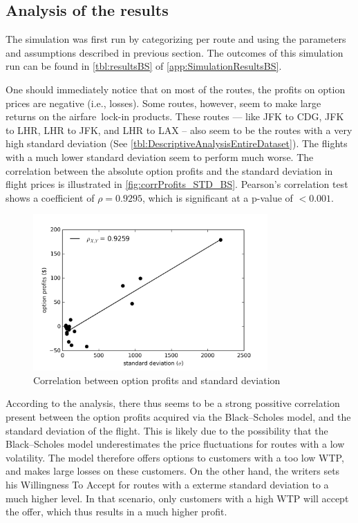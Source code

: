 \subsection{Analysis of the results}
\label{subsec:AnalysisOfBS}
The simulation was first run by categorizing per route and using the parameters and assumptions described in previous section. The outcomes of this simulation run can be found in \autoref{tbl:resultsBS} of \autoref{app:SimulationResultsBS}.

One should immediately notice that on most of the routes, the profits on option prices are negative (i.e., losses). Some routes, however, seem to make large returns on the airfare~lock-in products. These routes --- like JFK to CDG, JFK to LHR, LHR to JFK, and LHR to LAX -- also seem to be the routes with a very high standard deviation (See \autoref{tbl:DescriptiveAnalysisEntireDataset}). The flights with a much lower standard deviation seem to perform much worse. The correlation between the absolute option profits and the standard deviation in flight prices is illustrated in \autoref{fig:corrProfits_STD_BS}. Pearson's correlation test shows a coefficient of $\rho = 0.9295$, which is significant at a p-value of $< 0.001$.




\begin{figure}
    \centering
    \includegraphics[width=0.8\textwidth]{figures/correlation_optionProfits_STD_BS}
    \caption{Correlation between option profits and standard deviation}
    \label{fig:corrProfits_STD_BS}
\end{figure}

According to the analysis, there thus seems to be a strong possitive correlation present between the option profits acquired via the Black--Scholes model, and the standard deviation of the flight. This is likely due to the possibility that the Black--Scholes model underestimates the price fluctuations for routes with a low volatility. The model therefore offers options to customers with a too low WTP, and makes large losses on these customers. On the other hand, the writers sets his Willingness To Accept for routes with a exterme standard deviation to a much higher level. In that scenario, only customers with a high WTP will accept the offer, which thus results in a much higher profit. 

